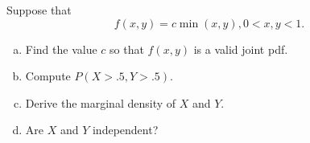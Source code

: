 \begin{frame}
  \begin{block}{\exercise}
  \begin{center}
  Suppose that
  $$
  f(x,y)=c \min(x,y), 0<x,y<1. 
  $$
  \begin{enumerate}[a)]
  \item Find the value $c$ so that $f(x,y)$ is a valid joint pdf.
  \item Compute $P(X > .5, Y > .5)$.
  \item Derive the marginal density of $X$ and $Y$.
  \item Are $X$ and $Y$ independent?
  \end{enumerate}
  \end{center}
  \end{block}
\end{frame}

